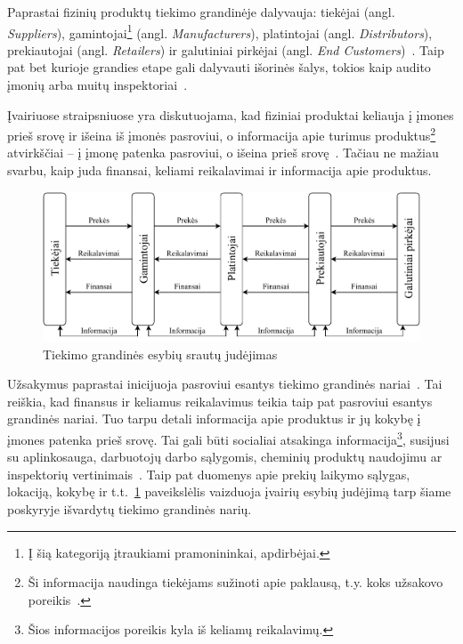 Paprastai fizinių produktų tiekimo grandinėje dalyvauja: tiekėjai (angl. \textit{Suppliers}), gamintojai\footnote{Į šią kategoriją įtraukiami pramonininkai, apdirbėjai.} (angl. \textit{Manufacturers}), platintojai (angl. \textit{Distributors}), prekiautojai (angl. \textit{Retailers}) ir galutiniai pirkėjai (angl. \textit{End Customers})~\cite{kopczak2003supply}. Taip pat bet kurioje grandies etape gali dalyvauti išorinės šalys, tokios kaip audito įmonių arba muitų inspektoriai~\cite{webber2009building}.

Įvairiuose straipsniuose yra diskutuojama, kad fiziniai produktai keliauja į įmones prieš srovę ir išeina iš įmonės pasroviui, o informacija apie turimus produktus\footnote{Ši informacija naudinga tiekėjams sužinoti apie paklausą, t.y. koks užsakovo poreikis~\cite{croson2005upstream}.} atvirkščiai – į įmonę patenka pasroviui, o išeina prieš srovę~\cite{prajogo2012supply, croson2005upstream}. Tačiau ne mažiau svarbu, kaip juda finansai, keliami reikalavimai ir informacija apie produktus.

\begin{figure}[H]
    \centering
    \includegraphics[scale=0.9]{images/supply-chain-entity-flow.pdf}
    \caption{Tiekimo grandinės esybių srautų judėjimas}
    \label{img:4}
\end{figure}

Užsakymus paprastai inicijuoja pasroviui esantys tiekimo grandinės nariai~\cite{croson2005upstream}. Tai reiškia, kad finansus ir keliamus reikalavimus teikia taip pat pasroviui esantys grandinės nariai. Tuo tarpu detali informacija apie produktus ir jų kokybę į įmones patenka prieš srovę. Tai gali būti socialiai atsakinga informacija\footnote{Šios informacijos poreikis kyla iš keliamų reikalavimų.}, susijusi su aplinkosauga, darbuotojų darbo sąlygomis, cheminių produktų naudojimu ar inspektorių vertinimais~\cite{mani2015supply, vachon2006extending}. Taip pat duomenys apie prekių laikymo sąlygas, lokaciją, kokybę ir t.t.~\ref{img:4} paveikslėlis vaizduoja įvairių esybių judėjimą tarp šiame poskyryje išvardytų tiekimo grandinės narių.



